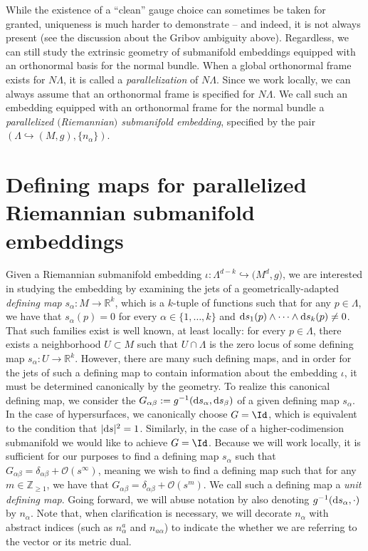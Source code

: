 While the existence of a ``clean'' gauge choice can sometimes be taken for granted, uniqueness is much harder to demonstrate -- and indeed, it is not always present (see the discussion about the Gribov ambiguity above). Regardless, we can still study the extrinsic geometry of submanifold embeddings equipped with an orthonormal basis for the normal bundle. When a global orthonormal frame exists for $N \Lambda$, it is called a \textit{parallelization} of $N \Lambda$. Since we work locally, we can always assume that an orthonormal frame is specified for $N \Lambda$. We call such an embedding equipped with an orthonormal frame for the normal bundle a \textit{parallelized $($Riemannian$)$ submanifold embedding}, specified by the pair $(\Lambda \hookrightarrow (M,g), \{n_{\alpha}\})$.

\section[Defining maps for parallelized Riemannian submanifold embeddings]{Defining maps for parallelized Riemannian submanifold\\ embeddings} \label{unit-def-funcs}

Given a Riemannian submanifold embedding $\iota \colon \Lambda^{d-k} \hookrightarrow \bigl(M^d,g\bigr)$, we are interested in studying the embedding by examining the jets of a geometrically-adapted \textit{defining map} $s_{\alpha} \colon M \rightarrow \mathbb{R}^k$, which is a $k$-tuple of functions such that for any $p \in \Lambda$, we have that $s_{\alpha}(p) = 0$ for every $\alpha \in \{1, \ldots, k\}$ and ${\rm d}s_{1}(p) \wedge \cdots \wedge {\rm d}s_{k}(p) \neq 0$. That such families exist is well known, at least locally: for every $p \in \Lambda$, there exists a neighborhood $U \subset M$ such that $U \cap \Lambda$ is the zero locus of some defining map $s_{\alpha} \colon U \rightarrow \mathbb{R}^k$. However, there are many such defining maps, and in order for the jets of such a defining map to contain information about the embedding $\iota$, it must be determined canonically by the geometry. To realize this canonical defining map, we consider the  $G_{\alpha \beta} := g^{-1}({\rm d}s_{\alpha},{\rm d}s_{\beta})$ of a given defining map $s_{\alpha}$. In the case of hypersurfaces, we canonically choose $G = \Id$, which is equivalent to the condition that $|{\rm d}s|^2 = 1$. Similarly, in the case of a higher-codimension submanifold we would like to achieve $G= \Id$. Because we will work locally, it is sufficient for our purposes to find a defining map $s_{\alpha}$ such that $G_{\alpha \beta} = \delta_{\alpha \beta} + \mathcal{O}(s^\infty)$, meaning we wish to find a defining map such that for any $m \in \mathbb{Z}_{\geq 1}$, we have that $G_{\alpha \beta} = \delta_{\alpha \beta} + \mathcal{O}(s^m)$. We call such a defining map a \textit{unit defining map}. Going forward, we will abuse notation by also denoting $g^{-1}({\rm d}s_{\alpha},\cdot)$ by $n_{\alpha}$. Note that, when clarification is necessary, we will decorate $n_{\alpha}$ with abstract indices (such as $n^a_{\alpha}$ and $n_{a \alpha}$) to indicate the whether we are referring to the vector or its metric dual.

